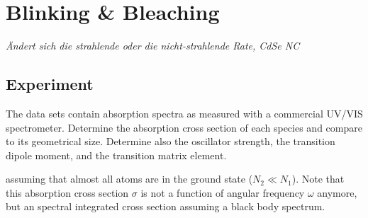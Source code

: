 

\chapter{Blinking \& Bleaching}



\textit{Ändert sich die strahlende oder die nicht-strahlende Rate, CdSe NC
}
\section{Experiment}

The data sets contain absorption spectra as measured with a commercial UV/VIS spectrometer. Determine the absorption cross section of each species and compare to its geometrical size. Determine also the oscillator strength, the transition dipole moment, and the transition matrix element.

assuming that almost all atoms are in the ground state ($N_2 \ll N_1$). Note that this absorption cross section $\sigma$ is not a function of angular frequency $\omega$ anymore, but an spectral integrated cross section assuming a black body spectrum.





\printbibliography[segment=\therefsegment,heading=subbibliography]
